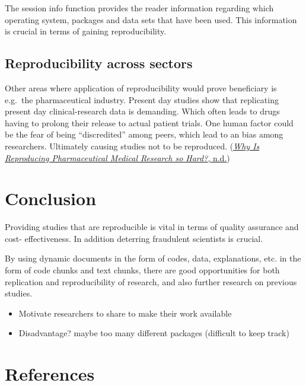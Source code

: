 \documentclass[
  11pt,
]{article}
\providecommand{\tightlist}{%
  \setlength{\itemsep}{0pt}\setlength{\parskip}{0pt}}
\begin{document}
The session info function provides the reader information regarding
which operating system, packages and data sets that have been used. This
information is crucial in terms of gaining reproducibility.

\hypertarget{reproducibility-across-sectors}{%
\subsection{Reproducibility across
sectors}\label{reproducibility-across-sectors}}

Other areas where application of reproducibility would prove beneficiary
is e.g.~the pharmaceutical industry. Present day studies show that
replicating present day clinical-research data is demanding. Which often
leads to drugs having to prolong their release to actual patient trials.
One human factor could be the fear of being ``discredited'' among peers,
which lead to an bias among researchers. Ultimately causing studies not
to be reproduced. (\protect\hyperlink{ref-Pharm-tech}{\emph{Why Is
Reproducing Pharmaceutical Medical Research so Hard?}, n.d.})

\hypertarget{conclusion}{%
\section{Conclusion}\label{conclusion}}

Providing studies that are reproducible is vital in terms of quality
assurance and cost- effectiveness. In addition deterring fraudulent
scientists is crucial.

By using dynamic documents in the form of codes, data, explanations,
etc. in the form of code chunks and text chunks, there are good
opportunities for both replication and reproducibility of research, and
also further research on previous studies.

\begin{itemize}
\tightlist
\item
  Motivate researchers to share to make their work available
\item
  Disadvantage? maybe too many different packages (difficult to keep
  track)
\end{itemize}

\newpage

\hypertarget{references}{%
\section{References}\label{references}}
\end{document}

